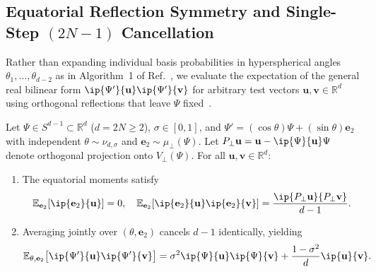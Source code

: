 \subsection{Equatorial Reflection Symmetry and Single-Step \texorpdfstring{$(2N - 1)$}{(2N - 1)} Cancellation}
\label{sec:reflection-cancellation}

Rather than expanding individual basis probabilities in hyperspherical angles $\theta_1, \dots, \theta_{d-2}$ as in Algorithm~1 of Ref.~\cite{SahaRoyLacalle2026}, we evaluate the expectation of the general real bilinear form $\ip{\Psi'}{\mathbf{u}}\ip{\Psi'}{\mathbf{v}}$ for arbitrary test vectors $\mathbf{u}, \mathbf{v} \in \mathbb{R}^d$ using orthogonal reflections that leave $\Psi$ fixed~\cite{Muirhead1982,MardiaJupp2000}.

\begin{theorem}
\label{thm:bilinear}
Let $\Psi \in S^{d-1} \subset \mathbb{R}^d$ ($d = 2N \ge 2$), $\sigma \in [0, 1]$, and $\Psi' = (\cos\theta)\Psi + (\sin\theta)\mathbf{e}_2$ with independent $\theta \sim \nu_{d,\sigma}$ and $\mathbf{e}_2 \sim \mu_\perp(\Psi)$. Let $P_\perp \mathbf{u} = \mathbf{u} - \ip{\Psi}{\mathbf{u}}\Psi$ denote orthogonal projection onto $V_\perp(\Psi)$. For all $\mathbf{u}, \mathbf{v} \in \mathbb{R}^d$:
\begin{enumerate}
\item The equatorial moments satisfy
\begin{equation}
\E_{\mathbf{e}_2}[\ip{\mathbf{e}_2}{\mathbf{u}}] = 0, \quad \E_{\mathbf{e}_2}[\ip{\mathbf{e}_2}{\mathbf{u}}\ip{\mathbf{e}_2}{\mathbf{v}}] = \frac{\ip{P_\perp \mathbf{u}}{P_\perp \mathbf{v}}}{d - 1}.
\label{eq:equatorial-moments}
\end{equation}
\item Averaging jointly over $(\theta, \mathbf{e}_2)$ cancels $d - 1$ identically, yielding
\begin{equation}
\E_{\theta, \mathbf{e}_2}\bigl[\ip{\Psi'}{\mathbf{u}}\ip{\Psi'}{\mathbf{v}}\bigr] = \sigma^2 \ip{\Psi}{\mathbf{u}}\ip{\Psi}{\mathbf{v}} + \frac{1 - \sigma^2}{d}\ip{\mathbf{u}}{\mathbf{v}}.
\label{eq:bilinear-onestep}
\end{equation}
\end{enumerate}
\end{theorem}

